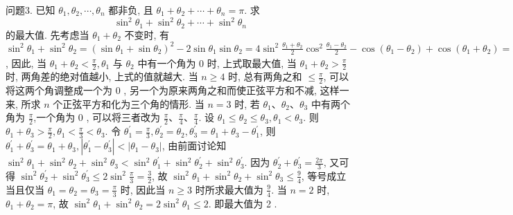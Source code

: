 问题3. 已知 $\theta_1, \theta_2, \cdots, \theta_n$ 都非负, 且 $\theta_1+\theta_2+\cdots+\theta_n=\pi$. 求
$$
\sin ^2 \theta_1+\sin ^2 \theta_2+\cdots+\sin ^2 \theta_n
$$
的最大值.
先考虑当 $\theta_1+\theta_2$ 不变时, 有 $\sin ^2 \theta_1+\sin ^2 \theta_2=\left(\sin \theta_1+\sin \theta_2\right)^2- 2 \sin \theta_1 \sin \theta_2=4 \sin ^2 \frac{\theta_1+\theta_2}{2} \cos ^2 \frac{\theta_1-\theta_2}{2}-\cos \left(\theta_1-\theta_2\right)+\cos \left(\theta_1+\theta_2\right)= 2 \cos ^2 \frac{\theta_1-\theta_2}{2}\left(2 \sin ^2 \frac{\theta_1+\theta_2}{2}-1\right)+1+\cos \left(\theta_1+\theta_2\right)$, 因此, 当 $\theta_1+\theta_2<\frac{\pi}{2}, \theta_1$ 与 $\theta_2$ 中有一个角为 0 时, 上式取最大值, 当 $\theta_1+\theta_2>\frac{\pi}{2}$ 时, 两角差的绝对值越小, 上式的值就越大.
当 $n \geqslant 4$ 时, 总有两角之和 $\leqslant \frac{\pi}{2}$, 可以将这两个角调整成一个为 0 , 另一个为原来两角之和而使正弦平方和不减, 这样一来, 所求 $n$ 个正弦平方和化为三个角的情形.
当 $n=3$ 时, 若 $\theta_1 、 \theta_2 、 \theta_3$ 中有两个角为 $\frac{\pi}{2}$,一个角为 0 , 可以将三者改为 $\frac{\pi}{2} 、 \frac{\pi}{4} 、 \frac{\pi}{4}$. 设 $\theta_1 \leqslant \theta_2 \leqslant \theta_3, \theta_1<\theta_3$. 则 $\theta_1+\theta_3>\frac{\pi}{2}, \theta_1<\frac{\pi}{3}<\theta_3$.
令 $\theta_1^{\prime}=\frac{\pi}{3}, \theta_2^{\prime}=\theta_2, \theta_3^{\prime}=\theta_1+\theta_3-\theta_1^{\prime}$, 则 $\theta_1^{\prime}+\theta_3^{\prime}=\theta_1+\theta_3,\left|\theta_1^{\prime}-\theta_3^{\prime}\right|< \left|\theta_1-\theta_3\right|$, 由前面讨论知 $\sin ^2 \theta_1+\sin ^2 \theta_2+\sin ^2 \theta_3<\sin ^2 \theta_1^{\prime}+\sin ^2 \theta_2^{\prime}+\sin ^2 \theta_3^{\prime}$. 因为 $\theta_2^{\prime}+\theta_3^{\prime}=\frac{2 \pi}{3}$, 又可得 $\sin ^2 \theta_2^{\prime}+\sin ^2 \theta_3^{\prime} \leqslant 2 \sin ^2 \frac{\pi}{3}=\frac{3}{2}$, 故 $\sin ^2 \theta_1+\sin ^2 \theta_2+ \sin ^2 \theta_3 \leqslant \frac{9}{4}$, 等号成立当且仅当 $\theta_1=\theta_2=\theta_3=\frac{\pi}{3}$ 时, 因此当 $n \geqslant 3$ 时所求最大值为 $\frac{9}{4}$.
当 $n=2$ 时, $\theta_1+\theta_2=\pi$, 故 $\sin ^2 \theta_1+\sin ^2 \theta_2=2 \sin ^2 \theta_1 \leqslant 2$. 即最大值为 2 .



